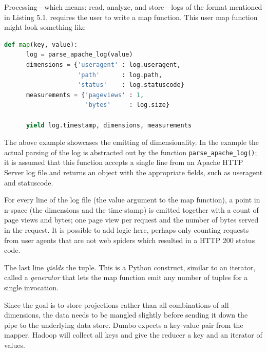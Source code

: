 Processing---which means: read, analyze, and store---logs of the format
mentioned in Listing 5.1, requires the user to write a map function. This user
map function might look something like

\vspace{12pt}

\begin{lstlisting}[language=Python,caption={An example map function, parsing
Apache access logs.},captionpos=b]
   def map(key, value):
      log = parse_apache_log(value)
      dimensions = {'useragent' : log.useragent,
                    'path'      : log.path,
                    'status'    : log.statuscode}
      measurements = {'pageviews' : 1,
                      'bytes'     : log.size}

      yield log.timestamp, dimensions, measurements
\end{lstlisting}

\vspace{12pt}

The above example showcases the emitting of dimensionality. In the example the
actual parsing of the log is abstracted out by the function
\texttt{parse\_apache\_log()}; it is assumed that this function accepts a single
line from an Apache HTTP Server log file and returns an object with the
appropriate fields, such as useragent and statuscode.

For every line of the log file (the value argument to the map function), a point
in n-space (the dimensions and the time-stamp) is emitted together with a count
of page views and bytes; one page view per request and the number of bytes served
in the request. It is possible to add logic here, perhaps only counting requests
from user agents that are not web spiders which resulted in a HTTP 200 status
code.

The last line \textit{yields} the tuple. This is a Python construct, similar to
an iterator, called a \textit{generator} that lets the map function emit any
number of tuples for a single invocation.

Since the goal is to store projections rather than all combinations of all
dimensions, the data needs to be mangled slightly before sending it down
the pipe to the underlying data store. Dumbo expects a key-value pair from the
mapper. Hadoop will collect all keys and give the reducer a key and an iterator
of values.

%

